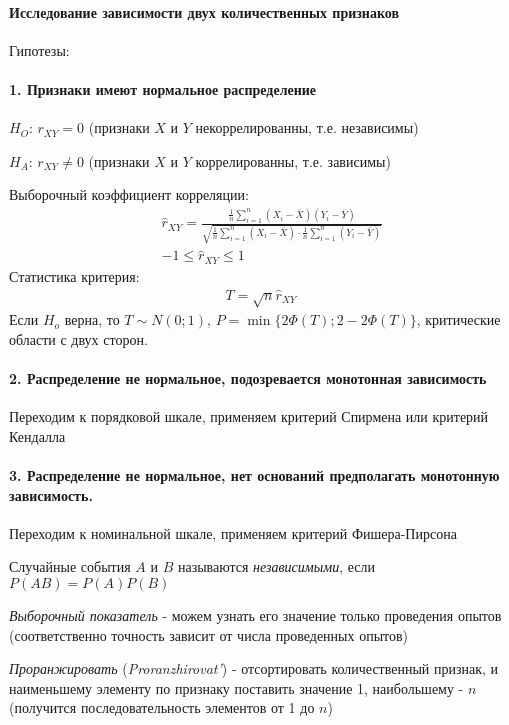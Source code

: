 \documentclass[12pt]{extarticle}
\begin{document}
\paragraph{Исследование зависимости двух количественных признаков}
Гипотезы:
\paragraph{1. Признаки имеют нормальное распределение}
\begin{description}
    \item $H_{O}$: $r_{XY}=0$ (признаки $X$ и $Y$ некоррелированны, т.е.
        независимы)
    \item $H_{A}$: $r_{XY}\neq 0$ (признаки $X$ и $Y$ коррелированны, т.е.
        зависимы)
\end{description}
Выборочный коэффициент корреляции:
\begin{eqnarray*}
    &&\hat{r}_{XY}
    =\frac{\frac{1}{n}\sum\limits_{i=1}^{n}(X_{i}-\bar{X})(Y_{i}-\bar{Y})}
    {\sqrt{\frac{1}{n}\sum\limits_{i=1}^{n}(X_{i}-\bar{X})
    \cdot \frac{1}{n}\sum\limits_{i=1}^{n}(Y_{i}-\bar{Y})}}\\
    && -1\leqslant \hat{r}_{XY} \leqslant 1
\end{eqnarray*}
Статистика критерия:
\begin{eqnarray*}
    T=\sqrt{n}\hat{r}_{XY}
\end{eqnarray*}
Если $H_{o}$ верна, то $T\sim N(0;1)$, $P=\min\{2\Phi(T);2-2\Phi(T)\}$,
критические области с двух сторон.

\paragraph{2. Распределение не нормальное, подозревается монотонная
зависимость}

Переходим к порядковой шкале, применяем критерий Спирмена или критерий
Кендалла

\paragraph{3. Распределение не нормальное, нет оснований предполагать
монотонную зависимость.}

Переходим к номинальной шкале, применяем критерий Фишера-Пирсона

\par Случайные события $A$ и $B$ называются
\textit{независимыми}, если
$P(AB)=P(A)P(B)$

\par \textit{Выборочный показатель} - можем узнать
его значение только проведения опытов (соответственно точность зависит от
числа проведенных опытов)

\par \textit{Проранжировать}
(\textit{Proranzhirovat'}) -
отсортировать количественный признак, и наименьшему элементу по признаку
поставить значение 1, наибольшему - $n$ (получится последовательность
элементов от 1 до $n$)
\end{document}
